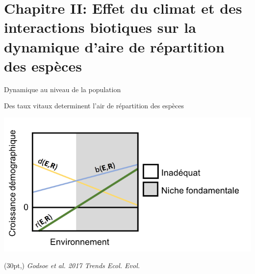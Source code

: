 \documentclass[11pt, compress, aspectratio=1610]{beamer}
\newcommand\smallcitation[1]{%
\begin{textblock*}{\textwidth}(30pt,\textheight)
	\raggedleft \footnotesize\textit{#1}
\end{textblock*}}
\begin{document}
\hypertarget{chapitre-ii-effet-du-climat-et-des-interactions-biotiques-sur-la-dynamique-daire-de-ruxe9partition-des-espuxe8ces}{%
\section{\texorpdfstring{Chapitre II: \newline Effet du climat et des
interactions biotiques sur la dynamique d’aire de répartition des
espèces}{Chapitre II: Effet du climat et des interactions biotiques sur la dynamique d’aire de répartition des espèces}}\label{chapitre-ii-effet-du-climat-et-des-interactions-biotiques-sur-la-dynamique-daire-de-ruxe9partition-des-espuxe8ces}}

\begin{frame}{Dynamique au niveau de la population}
\protect\hypertarget{dynamique-au-niveau-de-la-population}{}

Des taux vitaux determinent l’air de répartition des espèces

\centering

\includegraphics[scale=0.685]{figures/Godsoe2017a.png}

\par

\smallcitation{Godsoe et al. 2017 Trends Ecol. Evol.}

\end{frame}
\end{document}
